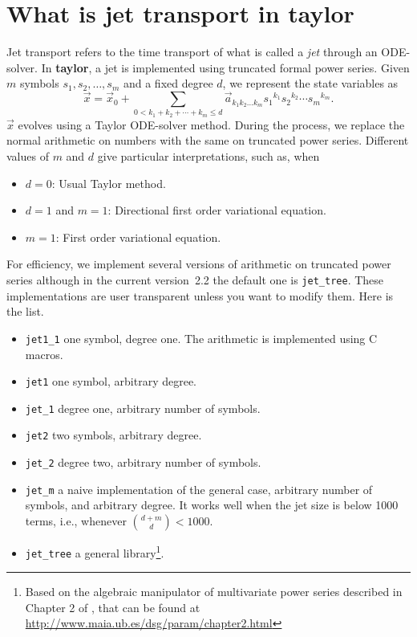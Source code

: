 \documentclass[10pt]{article}
\theoremstyle{remark}
\newcommand{\taylorname}{{\bf taylor}}
\newcommand{\version}{2.2}
\begin{document}
\section{What is jet transport in \taylorname{}} \label{sec:jettransport}
Jet transport refers to the time transport of what is called a {\em jet}
through an ODE-solver. In \taylorname{}, a jet is implemented using
truncated formal power series. Given $m$ symbols $s_1, s_2, \ldots,
s_m$ and a fixed degree $d$, we represent the state variables as
\begin{equation}
    {\vec x} = {\vec x}_0+\sum_{0<k_1+k_2+\cdots+k_m \leq d} {\vec
      a}_{k_1k_2...k_m}{s_1}^{k_1}{s_2}^{k_2}\cdots{s_m}^{k_m}.
\end{equation}
$\vec x$ evolves using a Taylor ODE-solver method. During the process,
we replace the normal arithmetic on numbers with the same on truncated
power series. Different values of $m$ and $d$ give particular
interpretations, such as, when
\begin{itemize}
    \item $d = 0$: Usual Taylor method.
    \item $d=1$ and $m=1$: Directional first order variational equation.
    \item $m=1$: First order variational equation.
\end{itemize}

For efficiency, we implement several versions of arithmetic on
truncated power series although in the current version~\version{} the
default one is \verb+jet_tree+. These implementations are user
transparent unless you want to modify them. Here is the list.
\begin{itemize}
    \item \verb+jet1_1+ one symbol, degree one. The arithmetic is
      implemented using C macros.
    \item \verb+jet1+ one symbol, arbitrary degree. 
    \item \verb+jet_1+ degree one, arbitrary number of symbols.
    \item \verb+jet2+ two symbols, arbitrary degree.
    \item \verb+jet_2+ degree two, arbitrary number of symbols.
    \item \verb+jet_m+ a naive implementation of the general case,
      arbitrary number of symbols, and arbitrary degree. It works well
      when the jet size is below 1000 terms, i.e., whenever ${{d+m}
        \choose {d}} < 1000$.
    \item \verb+jet_tree+ a general library\footnote{Based on the
    algebraic manipulator of multivariate power series described in
    Chapter 2 of \cite{Haetal16}, that can be found at
    \url{http://www.maia.ub.es/dsg/param/chapter2.html}}.
\end{itemize}
\end{document}

